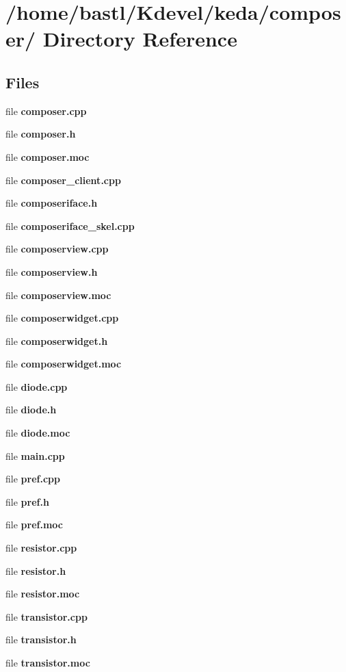 \section{/home/bastl/Kdevel/keda/composer/ Directory Reference}
\label{dir__2Fhome_2Fbastl_2FKdevel_2Fkeda_2Fcomposer_2F}
\subsection*{Files}
\begin{CompactItemize}
\item 
file {\bf composer.cpp}
\item 
file {\bf composer.h}
\item 
file {\bf composer.moc}
\item 
file {\bf composer\_\-client.cpp}
\item 
file {\bf composeriface.h}
\item 
file {\bf composeriface\_\-skel.cpp}
\item 
file {\bf composerview.cpp}
\item 
file {\bf composerview.h}
\item 
file {\bf composerview.moc}
\item 
file {\bf composerwidget.cpp}
\item 
file {\bf composerwidget.h}
\item 
file {\bf composerwidget.moc}
\item 
file {\bf diode.cpp}
\item 
file {\bf diode.h}
\item 
file {\bf diode.moc}
\item 
file {\bf main.cpp}
\item 
file {\bf pref.cpp}
\item 
file {\bf pref.h}
\item 
file {\bf pref.moc}
\item 
file {\bf resistor.cpp}
\item 
file {\bf resistor.h}
\item 
file {\bf resistor.moc}
\item 
file {\bf transistor.cpp}
\item 
file {\bf transistor.h}
\item 
file {\bf transistor.moc}
\end{CompactItemize}
